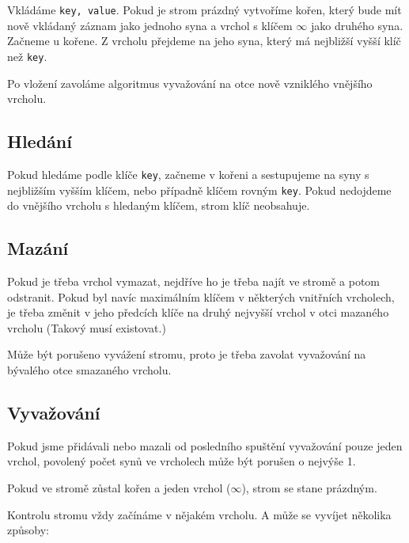\documentclass[a4paper,11pt,openany]{article}
\begin{document}
Vkládáme \texttt{key, value}.  Pokud  je  strom  prázdný  vytvoříme  kořen,  který  bude  mít  nově  vkládaný záznam jako jednoho syna a vrchol s klíčem $\infty$ jako druhého syna. Začneme u kořene. Z vrcholu přejdeme na jeho syna, který má nejbližší vyšší klíč než \texttt{key}.

Po vložení zavoláme algoritmus vyvažování na otce nově vzniklého vnějšího vrcholu.
	
\subsection{Hledání}

Pokud hledáme podle klíče \texttt{key}, začneme v kořeni a sestupujeme na syny s nejbližším vyšším klíčem, nebo případně klíčem rovným \texttt{key}. Pokud nedojdeme do vnějšího vrcholu s hledaným klíčem, strom klíč neobsahuje.

\subsection{Mazání}

Pokud je třeba vrchol vymazat, nejdříve ho je třeba najít ve stromě a potom odstranit. Pokud byl navíc maximálním klíčem v některých vnitřních vrcholech, je třeba změnit v jeho předcích klíče na druhý nejvyšší vrchol v otci mazaného vrcholu (Takový musí existovat.)

Může být porušeno vyvážení stromu, proto je třeba zavolat vyvažování na bývalého otce smazaného vrcholu.
	
\subsection{Vyvažování}

Pokud jsme přidávali nebo mazali od posledního spuštění vyvažování pouze jeden vrchol, povolený počet synů ve vrcholech může být porušen o nejvýše 1.

Pokud ve stromě zůstal kořen a jeden vrchol ($\infty$), strom se stane prázdným.

Kontrolu stromu vždy začínáme v nějakém vrcholu. A může se vyvíjet několika způsoby:
\end{document}
